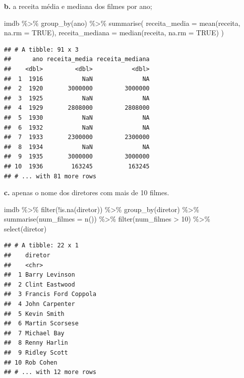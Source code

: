 \documentclass[
]{book}
\newenvironment{Shaded}{\begin{snugshade}}{\end{snugshade}}
\newcommand{\AttributeTok}[1]{\textcolor[rgb]{0.77,0.63,0.00}{#1}}
\newcommand{\ConstantTok}[1]{\textcolor[rgb]{0.00,0.00,0.00}{#1}}
\newcommand{\DecValTok}[1]{\textcolor[rgb]{0.00,0.00,0.81}{#1}}
\newcommand{\FunctionTok}[1]{\textcolor[rgb]{0.00,0.00,0.00}{#1}}
\newcommand{\NormalTok}[1]{#1}
\newcommand{\SpecialCharTok}[1]{\textcolor[rgb]{0.00,0.00,0.00}{#1}}
\begin{document}
\textbf{b.} a receita média e mediana dos filmes por ano;

\begin{Shaded}
\begin{Highlighting}[]
\NormalTok{imdb }\SpecialCharTok{\%\textgreater{}\%} 
  \FunctionTok{group\_by}\NormalTok{(ano) }\SpecialCharTok{\%\textgreater{}\%} 
  \FunctionTok{summarise}\NormalTok{(}
    \AttributeTok{receita\_media =} \FunctionTok{mean}\NormalTok{(receita, }\AttributeTok{na.rm =} \ConstantTok{TRUE}\NormalTok{),}
    \AttributeTok{receita\_mediana =} \FunctionTok{median}\NormalTok{(receita, }\AttributeTok{na.rm =} \ConstantTok{TRUE}\NormalTok{)}
\NormalTok{  )}
\end{Highlighting}
\end{Shaded}

\begin{verbatim}
## # A tibble: 91 x 3
##      ano receita_media receita_mediana
##    <dbl>         <dbl>           <dbl>
##  1  1916           NaN              NA
##  2  1920       3000000         3000000
##  3  1925           NaN              NA
##  4  1929       2808000         2808000
##  5  1930           NaN              NA
##  6  1932           NaN              NA
##  7  1933       2300000         2300000
##  8  1934           NaN              NA
##  9  1935       3000000         3000000
## 10  1936        163245          163245
## # ... with 81 more rows
\end{verbatim}

\textbf{c.} apenas o nome dos diretores com mais de 10 filmes.

\begin{Shaded}
\begin{Highlighting}[]
\NormalTok{imdb }\SpecialCharTok{\%\textgreater{}\%} 
  \FunctionTok{filter}\NormalTok{(}\SpecialCharTok{!}\FunctionTok{is.na}\NormalTok{(diretor)) }\SpecialCharTok{\%\textgreater{}\%} 
  \FunctionTok{group\_by}\NormalTok{(diretor) }\SpecialCharTok{\%\textgreater{}\%} 
  \FunctionTok{summarise}\NormalTok{(}\AttributeTok{num\_filmes =} \FunctionTok{n}\NormalTok{()) }\SpecialCharTok{\%\textgreater{}\%} 
  \FunctionTok{filter}\NormalTok{(num\_filmes }\SpecialCharTok{\textgreater{}} \DecValTok{10}\NormalTok{) }\SpecialCharTok{\%\textgreater{}\%} 
  \FunctionTok{select}\NormalTok{(diretor)}
\end{Highlighting}
\end{Shaded}

\begin{verbatim}
## # A tibble: 22 x 1
##    diretor             
##    <chr>               
##  1 Barry Levinson      
##  2 Clint Eastwood      
##  3 Francis Ford Coppola
##  4 John Carpenter      
##  5 Kevin Smith         
##  6 Martin Scorsese     
##  7 Michael Bay         
##  8 Renny Harlin        
##  9 Ridley Scott        
## 10 Rob Cohen           
## # ... with 12 more rows
\end{verbatim}
\end{document}

